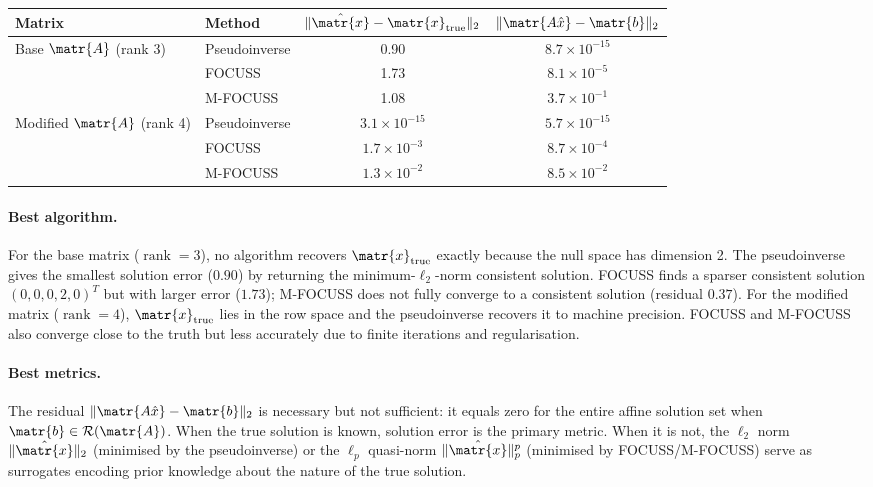 \begin{center}
\begin{tabular}{llcc}
  \hline
  Matrix & Method & $\|\hat{\matr{x}}-\matr{x}_{\mathrm{true}}\|_2$ & $\|\matr{A\hat{x}}-\matr{b}\|_2$ \\
  \hline
  Base $\matr{A}$ (rank 3)     & Pseudoinverse & 0.90                & $8.7\times10^{-15}$ \\
                                & FOCUSS        & 1.73                & $8.1\times10^{-5}$  \\
                                & M-FOCUSS      & 1.08                & $3.7\times10^{-1}$  \\
  \hline
  Modified $\matr{A}$ (rank 4) & Pseudoinverse & $3.1\times10^{-15}$ & $5.7\times10^{-15}$ \\
                                & FOCUSS        & $1.7\times10^{-3}$  & $8.7\times10^{-4}$  \\
                                & M-FOCUSS      & $1.3\times10^{-2}$  & $8.5\times10^{-2}$  \\
  \hline
\end{tabular}
\end{center}

\paragraph{Best algorithm.}
For the base matrix ($\operatorname{rank}=3$), no algorithm recovers
$\matr{x}_{\mathrm{true}}$ exactly because the null space has dimension 2.
The pseudoinverse gives the smallest solution error ($0.90$) by returning the
minimum-$\ell_2$-norm consistent solution.
FOCUSS finds a sparser consistent solution $(0,0,0,2,0)^T$ but with larger error
($1.73$); M-FOCUSS does not fully converge to a consistent solution (residual
$0.37$).
For the modified matrix ($\operatorname{rank}=4$), $\matr{x}_{\mathrm{true}}$
lies in the row space and the pseudoinverse recovers it to machine precision.
FOCUSS and M-FOCUSS also converge close to the truth but less accurately due to
finite iterations and regularisation.

\paragraph{Best metrics.}
The residual $\|\matr{A\hat{x}}-\matr{b}\|_2$ is necessary but not sufficient:
it equals zero for the entire affine solution set when $\matr{b}\in\mathcal{R}(\matr{A})$.
When the true solution is known, solution error is the primary metric.
When it is not, the $\ell_2$ norm $\|\hat{\matr{x}}\|_2$ (minimised by the
pseudoinverse) or the $\ell_p$ quasi-norm $\|\hat{\matr{x}}\|_p^p$ (minimised
by FOCUSS/M-FOCUSS) serve as surrogates encoding prior knowledge about the
nature of the true solution.
